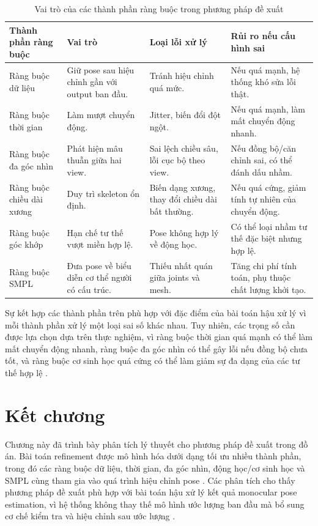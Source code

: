 \documentclass[../DoAn.tex]{subfiles}
\begin{document}
\begin{table}[H]
\centering
\caption{Vai trò của các thành phần ràng buộc trong phương pháp đề xuất}
\label{tab:constraint_roles}
\begin{tabular}{|p{3.4cm}|p{4.1cm}|p{3.0cm}|p{3.6cm}|}
\hline
\textbf{Thành phần ràng buộc} & \textbf{Vai trò} & \textbf{Loại lỗi xử lý} & \textbf{Rủi ro nếu cấu hình sai} \\
\hline
Ràng buộc dữ liệu & Giữ pose sau hiệu chỉnh gần với output ban đầu. & Tránh hiệu chỉnh quá mức. & Nếu quá mạnh, hệ thống khó sửa lỗi thật. \\
\hline
Ràng buộc thời gian & Làm mượt chuyển động. & Jitter, biến đổi đột ngột. & Nếu quá mạnh, làm mất chuyển động nhanh. \\
\hline
Ràng buộc đa góc nhìn & Phát hiện mâu thuẫn giữa hai view. & Sai lệch chiều sâu, lỗi cục bộ theo view. & Nếu đồng bộ/căn chỉnh sai, có thể đánh dấu nhầm. \\
\hline
Ràng buộc chiều dài xương & Duy trì skeleton ổn định. & Biến dạng xương, thay đổi chiều dài bất thường. & Nếu quá cứng, giảm tính tự nhiên của chuyển động. \\
\hline
Ràng buộc góc khớp & Hạn chế tư thế vượt miền hợp lệ. & Pose không hợp lý về động học. & Có thể loại nhầm tư thế đặc biệt nhưng hợp lệ. \\
\hline
Ràng buộc SMPL & Đưa pose về biểu diễn cơ thể người có cấu trúc. & Thiếu nhất quán giữa joints và mesh. & Tăng chi phí tính toán, phụ thuộc chất lượng khởi tạo. \\
\hline
\end{tabular}
\end{table}

Sự kết hợp các thành phần trên phù hợp với đặc điểm của bài toán hậu xử lý vì mỗi thành phần xử lý một loại sai số khác nhau. Tuy nhiên, các trọng số cần được lựa chọn dựa trên thực nghiệm, vì ràng buộc thời gian quá mạnh có thể làm mất chuyển động nhanh, ràng buộc đa góc nhìn có thể gây lỗi nếu đồng bộ chưa tốt, và ràng buộc cơ sinh học quá cứng có thể làm giảm sự đa dạng của các tư thế hợp lệ \cite{physcap2020,gu2024multiview,delp2007opensim}.

\section{Kết chương}

Chương này đã trình bày phân tích lý thuyết cho phương pháp đề xuất trong đồ án. Bài toán refinement được mô hình hóa dưới dạng tối ưu nhiều thành phần, trong đó các ràng buộc dữ liệu, thời gian, đa góc nhìn, động học/cơ sinh học và SMPL cùng tham gia vào quá trình hiệu chỉnh pose \cite{smpl2015,smplify2016,physcap2020,gu2024multiview}. Các phân tích cho thấy phương pháp đề xuất phù hợp với bài toán hậu xử lý kết quả monocular pose estimation, vì hệ thống không thay thế mô hình ước lượng ban đầu mà bổ sung cơ chế kiểm tra và hiệu chỉnh sau ước lượng \cite{shin2024wham}.
\end{document}

